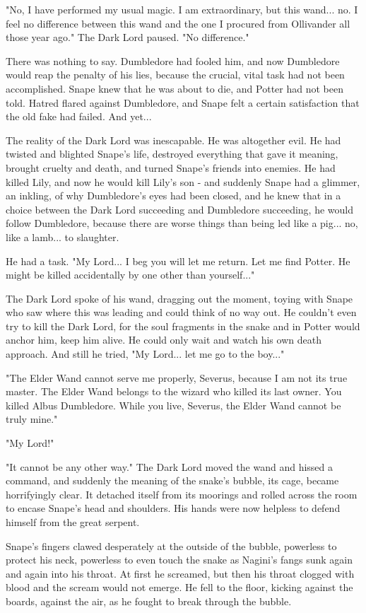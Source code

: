 \documentclass[a4paper,11pt]{article}
\begin{document}
"No, I have performed my usual magic. I am extraordinary, but this wand... no. I feel no difference between this wand and the one I procured from Ollivander all those year ago." The Dark Lord paused. "No difference."

There was nothing to say. Dumbledore had fooled him, and now Dumbledore would reap the penalty of his lies, because the crucial, vital task had not been accomplished. Snape knew that he was about to die, and Potter had not been told. Hatred flared against Dumbledore, and Snape felt a certain satisfaction that the old fake had failed. And yet...

The reality of the Dark Lord was inescapable. He was altogether evil. He had twisted and blighted Snape's life, destroyed everything that gave it meaning, brought cruelty and death, and turned Snape's friends into enemies. He had killed Lily, and now he would kill Lily's son - and suddenly Snape had a glimmer, an inkling, of why Dumbledore's eyes had been closed, and he knew that in a choice between the Dark Lord succeeding and Dumbledore succeeding, he would follow Dumbledore, because there are worse things than being led like a pig... no, like a lamb... to slaughter.

He had a task. "My Lord... I beg you will let me return. Let me find Potter. He might be killed accidentally by one other than yourself..."

The Dark Lord spoke of his wand, dragging out the moment, toying with Snape who saw where this was leading and could think of no way out. He couldn't even try to kill the Dark Lord, for the soul fragments in the snake and in Potter would anchor him, keep him alive. He could only wait and watch his own death approach. And still he tried, "My Lord... let me go to the boy..."

"The Elder Wand cannot serve me properly, Severus, because I am not its true master. The Elder Wand belongs to the wizard who killed its last owner. You killed Albus Dumbledore. While you live, Severus, the Elder Wand cannot be truly mine."

"My Lord!"

"It cannot be any other way." The Dark Lord moved the wand and hissed a command, and suddenly the meaning of the snake's bubble, its cage, became horrifyingly clear. It detached itself from its moorings and rolled across the room to encase Snape's head and shoulders. His hands were now helpless to defend himself from the great serpent.

Snape's fingers clawed desperately at the outside of the bubble, powerless to protect his neck, powerless to even touch the snake as Nagini's fangs sunk again and again into his throat. At first he screamed, but then his throat clogged with blood and the scream would not emerge. He fell to the floor, kicking against the boards, against the air, as he fought to break through the bubble.
\end{document}
